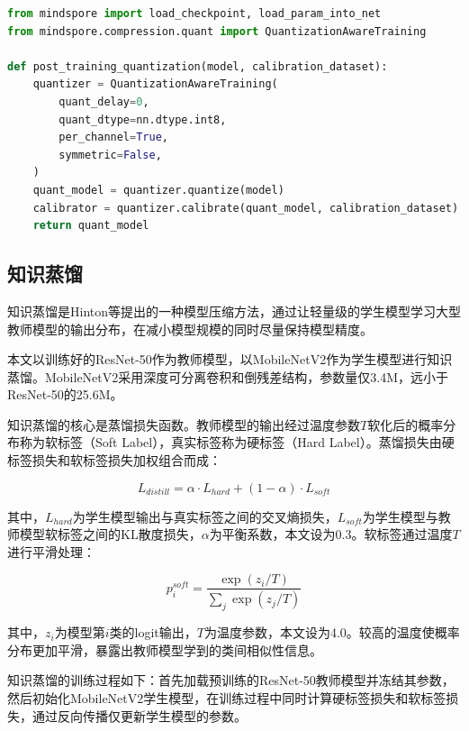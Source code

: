 \begin{lstlisting}[language=Python, caption={MindSpore训练后量化实现}]
from mindspore import load_checkpoint, load_param_into_net
from mindspore.compression.quant import QuantizationAwareTraining

def post_training_quantization(model, calibration_dataset):
    quantizer = QuantizationAwareTraining(
        quant_delay=0,
        quant_dtype=nn.dtype.int8,
        per_channel=True,
        symmetric=False,
    )
    quant_model = quantizer.quantize(model)
    calibrator = quantizer.calibrate(quant_model, calibration_dataset)
    return quant_model
\end{lstlisting}

\subsection{知识蒸馏}

知识蒸馏是Hinton等\cite{hinton2015distilling}提出的一种模型压缩方法，通过让轻量级的学生模型学习大型教师模型的输出分布，在减小模型规模的同时尽量保持模型精度。

本文以训练好的ResNet-50作为教师模型，以MobileNetV2\cite{howard2017mobilenets}作为学生模型进行知识蒸馏。MobileNetV2采用深度可分离卷积和倒残差结构，参数量仅3.4M，远小于ResNet-50的25.6M。

知识蒸馏的核心是蒸馏损失函数。教师模型的输出经过温度参数$T$软化后的概率分布称为软标签（Soft Label），真实标签称为硬标签（Hard Label）。蒸馏损失由硬标签损失和软标签损失加权组合而成：

\begin{equation}
	L_{distill} = \alpha \cdot L_{hard} + (1 - \alpha) \cdot L_{soft}
	\label{eq:distill_loss}
\end{equation}

其中，$L_{hard}$为学生模型输出与真实标签之间的交叉熵损失，$L_{soft}$为学生模型与教师模型软标签之间的KL散度损失，$\alpha$为平衡系数，本文设为0.3。软标签通过温度$T$进行平滑处理：

\begin{equation}
	p_i^{soft} = \frac{\exp(z_i / T)}{\sum_j \exp(z_j / T)}
	\label{eq:softmax_temp}
\end{equation}

其中，$z_i$为模型第$i$类的logit输出，$T$为温度参数，本文设为4.0。较高的温度使概率分布更加平滑，暴露出教师模型学到的类间相似性信息。

知识蒸馏的训练过程如下：首先加载预训练的ResNet-50教师模型并冻结其参数，然后初始化MobileNetV2学生模型，在训练过程中同时计算硬标签损失和软标签损失，通过反向传播仅更新学生模型的参数。

